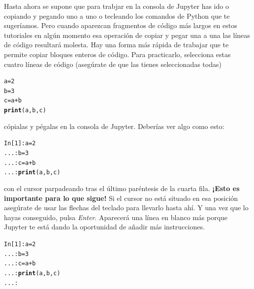 \documentclass[10pt,a4paper]{article}\usepackage[]{graphicx}\usepackage[]{color}
\makeatletter
\newcommand{\hlnum}[1]{\textcolor[rgb]{0.686,0.059,0.569}{#1}}%
\newcommand{\hlopt}[1]{\textcolor[rgb]{0,0,0}{#1}}%
\newcommand{\hlstd}[1]{\textcolor[rgb]{0.345,0.345,0.345}{#1}}%
\newcommand{\hlkwb}[1]{\textcolor[rgb]{0.69,0.353,0.396}{#1}}%
\newcommand{\hlkwd}[1]{\textcolor[rgb]{0.737,0.353,0.396}{\textbf{#1}}}%
\newenvironment{kframe}{%
 \def\at@end@of@kframe{}%
 \ifinner\ifhmode%
  \def\at@end@of@kframe{\end{minipage}}%
  \begin{minipage}{\columnwidth}%
 \fi\fi%
 \def\FrameCommand##1{\hskip\@totalleftmargin \hskip-\fboxsep
 \colorbox{shadecolor}{##1}\hskip-\fboxsep
     \hskip-\linewidth \hskip-\@totalleftmargin \hskip\columnwidth}%
 \MakeFramed {\advance\hsize-\width
   \@totalleftmargin\z@ \linewidth\hsize
   \@setminipage}}%
 {\par\unskip\endMakeFramed%
 \at@end@of@kframe}
\newenvironment{knitrout}{}{} %
\makeatother
\begin{document}
Hasta ahora se supone que para trabjar en la consola de Jupyter has ido o copiando y pegando uno a uno o tecleando los comandos de Python que te sugeríamos. Pero cuando aparezcan fragmentos de código más largos en estos tutoriales en algún momento esa operación de copiar y pegar una a una las líneas de código resultará molesta. Hay una forma más rápida de trabajar que te permite copiar bloques enteros de código. Para practicarlo, selecciona estas cuatro líneas de código (asegúrate de que las tienes seleccionadas todas)
\begin{knitrout}
\color{fgcolor}\begin{kframe}
\begin{alltt}
\hlstd{a} \hlkwb{=} \hlnum{2}
\hlstd{b} \hlkwb{=} \hlnum{3}
\hlstd{c} \hlkwb{=} \hlstd{a} \hlopt{+} \hlstd{b}
\hlkwd{print}\hlstd{(a, b, c)}
\end{alltt}
\end{kframe}
\end{knitrout}
cópialas y pégalas en la consola de Jupyter. Deberías ver algo como esto:
\begin{knitrout}
\color{fgcolor}\begin{kframe}
\begin{alltt}
\hlstd{In [}\hlnum{1}\hlstd{]}\hlopt{:} \hlstd{a} \hlkwb{=} \hlnum{2}
   \hlstd{...}\hlopt{:} \hlstd{b} \hlkwb{=} \hlnum{3}
   \hlstd{...}\hlopt{:} \hlstd{c} \hlkwb{=} \hlstd{a} \hlopt{+} \hlstd{b}
   \hlstd{...}\hlopt{:} \hlkwd{print}\hlstd{(a, b, c)}
\end{alltt}
\end{kframe}
\end{knitrout}
con el cursor parpadeando tras el último paréntesis de la cuarta fila. {\bf ¡Esto es importante para lo que sigue!} Si el cursor no está situado en esa posición asegúrate de usar las flechas del teclado para llevarlo hasta ahí. Y una vez que lo hayas conseguido, pulsa {\em Enter}. Aparecerá una línea en blanco más porque Jupyter te está dando la oportunidad de añadir más instrucciones.
\begin{knitrout}
\color{fgcolor}\begin{kframe}
\begin{alltt}
In [1]: a = 2
   ...: b = 3
   ...: c = a + b
   ...: \hlkwd{print}(a, b, c)
   ...:
\end{alltt}
\end{kframe}
\end{knitrout}
\end{document}
